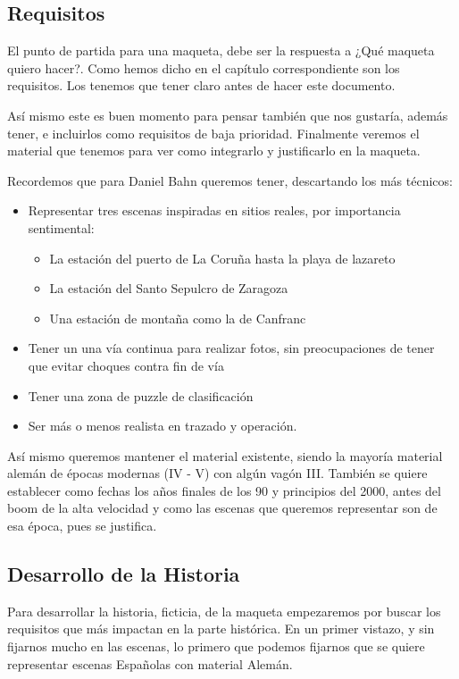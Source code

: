 \subsection{Requisitos}
El punto de partida para una maqueta, debe ser la respuesta a ¿Qué maqueta quiero hacer?.
Como hemos dicho en el capítulo correspondiente son los requisitos. Los tenemos que tener
claro antes de hacer este documento. 
 
Así mismo este es buen momento para pensar también que nos gustaría, además tener, e
incluirlos como requisitos de baja prioridad. Finalmente veremos el material que tenemos
para ver como integrarlo y justificarlo en la maqueta. 
 
Recordemos que para Daniel Bahn queremos tener, descartando los más técnicos:
\begin{itemize}
\item Representar tres escenas inspiradas en sitios reales, por importancia sentimental:
\begin{itemize}
\item La estación del puerto de La Coruña hasta la playa de lazareto 
\item La estación del Santo Sepulcro de Zaragoza 
\item Una estación de montaña como la de Canfranc 
\end{itemize}
\item Tener un una vía continua para realizar fotos, sin preocupaciones de tener
que evitar choques contra fin de vía 
\item Tener una zona de puzzle de clasificación 
\item Ser más o menos realista en trazado y operación. 
\end{itemize}
 
Así mismo queremos mantener el material existente, siendo la mayoría material alemán de
épocas modernas (IV - V) con algún vagón III. También se quiere establecer como fechas 
los años finales de los 90 y principios del 2000, antes del boom de la alta velocidad
y como las escenas que queremos representar son de esa época, pues se justifica. 

\subsection{Desarrollo de la Historia}
Para desarrollar la historia, ficticia, de la maqueta empezaremos por buscar los
requisitos que más impactan en la parte histórica. En un primer vistazo, y sin fijarnos
mucho en las escenas, lo primero que podemos fijarnos que se quiere representar escenas
Españolas con material Alemán. 
 
